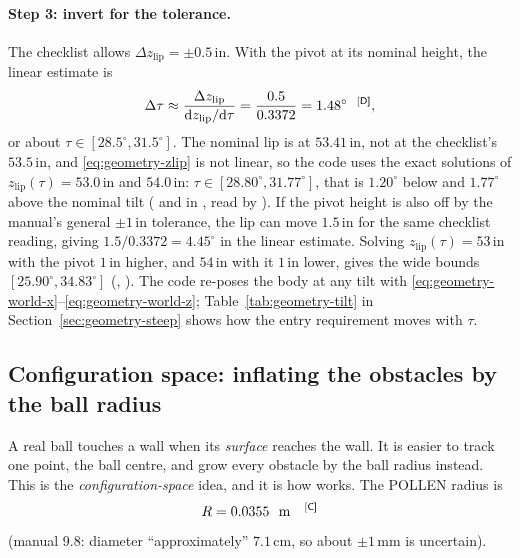 \paragraph{Step 3: invert for the tolerance.} The checklist allows
$\Delta z_{\mathrm{lip}} = \pm 0.5$\,\unit{in}\confirmed. With the pivot at its nominal height, the
linear estimate is
\begin{equation}
  \Delta\tau \approx \frac{\Delta z_{\mathrm{lip}}}{\mathrm{d}z_{\mathrm{lip}}/\mathrm{d}\tau}
  = \frac{0.5}{0.3372} = 1.48^\circ\text{\derived},
  \label{eq:geometry-tilt-bound}
\end{equation}
or about $\tau \in [28.5^\circ, 31.5^\circ]$\derived. The nominal lip is at $53.41$\,\unit{in}\derived,
not at the checklist's $53.5$\,\unit{in}\confirmed, and \eqref{eq:geometry-zlip} is not linear, so the
code uses the exact solutions of $z_{\mathrm{lip}}(\tau) = 53.0$\,\unit{in}\derived{} and
$54.0$\,\unit{in}\derived: $\tau \in [28.80^\circ, 31.77^\circ]$\derived, that is $1.20^\circ$\derived{} below and
$1.77^\circ$\derived{} above the nominal tilt ( and  in
, read by ).
If the pivot height is also off by the manual's general $\pm 1$\,\unit{in}\confirmed{} tolerance,
the lip can move $1.5$\,\unit{in}\derived{} for the same checklist reading, giving
$1.5/0.3372 = 4.45^\circ$\derived{} in the linear estimate. Solving $z_{\mathrm{lip}}(\tau) =
53$\,\unit{in}\derived{} with the pivot $1$\,\unit{in}\confirmed{} higher, and $54$\,\unit{in}\derived{}
with it $1$\,\unit{in}\confirmed{} lower, gives the wide bounds $[25.90^\circ, 34.83^\circ]$\derived{}
(, ). The code re-poses the body at any tilt with
\eqref{eq:geometry-world-x}--\eqref{eq:geometry-world-z}; Table~\ref{tab:geometry-tilt} in
Section~\ref{sec:geometry-steep} shows how the entry requirement moves with $\tau$.

\subsection{Configuration space: inflating the obstacles by the ball radius}
\label{sec:geometry-cspace}

A real ball touches a wall when its \emph{surface} reaches the wall. It is easier to track one
point, the ball centre, and grow every obstacle by the ball radius instead. This is the
\emph{configuration-space} idea, and it is how  works. The POLLEN radius is
\begin{equation}
  R = 0.0355\ \text{\unit{m}}\text{\confirmed}
  \label{eq:geometry-radius}
\end{equation}
(manual 9.8: diameter ``approximately'' $7.1$\,\unit{cm}\confirmed, so about $\pm 1$\,\unit{mm}\assumed{}
is uncertain).

